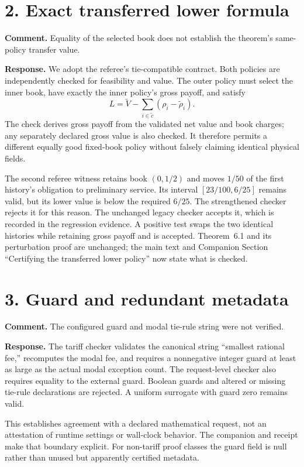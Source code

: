 \documentclass[11pt,letterpaper]{article}
\begin{document}
\section*{2. Exact transferred lower formula}
\textbf{Comment.} Equality of the selected book does not establish the theorem's same-policy transfer value.

\textbf{Response.} We adopt the referee's tie-compatible contract. Both policies are independently checked for feasibility and value. The outer policy must select the inner book, have exactly the inner policy's gross payoff, and satisfy
\[
 L=\widetilde V-\sum_{i\in\widetilde c}(\rho_i-\widetilde\rho_i).
\]
The check derives gross payoff from the validated net value and book charges; any separately declared gross value is also checked. It therefore permits a different equally good fixed-book policy without falsely claiming identical physical fields.

The second referee witness retains book $(0,1/2)$ and moves $1/50$ of the first history's obligation to preliminary service. Its interval $[23/100,6/25]$ remains valid, but its lower value is below the required $6/25$. The strengthened checker rejects it for this reason. The unchanged legacy checker accepts it, which is recorded in the regression evidence. A positive test swaps the two identical histories while retaining gross payoff and is accepted. Theorem~6.1 and its perturbation proof are unchanged; the main text and Companion Section ``Certifying the transferred lower policy'' now state what is checked.

\section*{3. Guard and redundant metadata}
\textbf{Comment.} The configured guard and modal tie-rule string were not verified.

\textbf{Response.} The tariff checker validates the canonical string ``smallest rational fee,'' recomputes the modal fee, and requires a nonnegative integer guard at least as large as the actual modal exception count. The request-level checker also requires equality to the external guard. Boolean guards and altered or missing tie-rule declarations are rejected. A uniform surrogate with guard zero remains valid.

This establishes agreement with a declared mathematical request, not an attestation of runtime settings or wall-clock behavior. The companion and receipt make that boundary explicit. For non-tariff proof classes the guard field is null rather than unused but apparently certified metadata.
\end{document}
